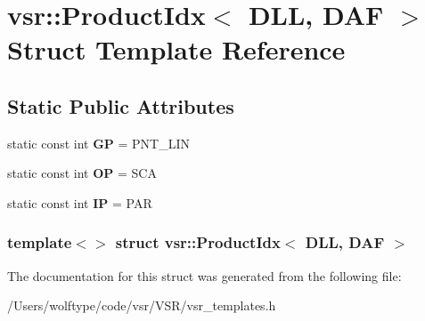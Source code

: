 \hypertarget{structvsr_1_1_product_idx_3_01_d_l_l_00_01_d_a_f_01_4}{\section{vsr\-:\-:Product\-Idx$<$ D\-L\-L, D\-A\-F $>$ Struct Template Reference}
\label{structvsr_1_1_product_idx_3_01_d_l_l_00_01_d_a_f_01_4}
}
\subsection*{Static Public Attributes}
\begin{DoxyCompactItemize}
\item 
\hypertarget{structvsr_1_1_product_idx_3_01_d_l_l_00_01_d_a_f_01_4_ad13574d0ae1d29c0e413010ecbe8c6d5}{static const int {\bfseries G\-P} = P\-N\-T\-\_\-\-L\-I\-N}\label{structvsr_1_1_product_idx_3_01_d_l_l_00_01_d_a_f_01_4_ad13574d0ae1d29c0e413010ecbe8c6d5}

\item 
\hypertarget{structvsr_1_1_product_idx_3_01_d_l_l_00_01_d_a_f_01_4_aa2604cd8fad0885ec20c1ef8a1de5acf}{static const int {\bfseries O\-P} = S\-C\-A}\label{structvsr_1_1_product_idx_3_01_d_l_l_00_01_d_a_f_01_4_aa2604cd8fad0885ec20c1ef8a1de5acf}

\item 
\hypertarget{structvsr_1_1_product_idx_3_01_d_l_l_00_01_d_a_f_01_4_a8030b1d4437dfb52919f889c0dd200ef}{static const int {\bfseries I\-P} = P\-A\-R}\label{structvsr_1_1_product_idx_3_01_d_l_l_00_01_d_a_f_01_4_a8030b1d4437dfb52919f889c0dd200ef}

\end{DoxyCompactItemize}
\subsubsection*{template$<$$>$ struct vsr\-::\-Product\-Idx$<$ D\-L\-L, D\-A\-F $>$}



The documentation for this struct was generated from the following file\-:\begin{DoxyCompactItemize}
\item 
/\-Users/wolftype/code/vsr/\-V\-S\-R/vsr\-\_\-templates.\-h\end{DoxyCompactItemize}
